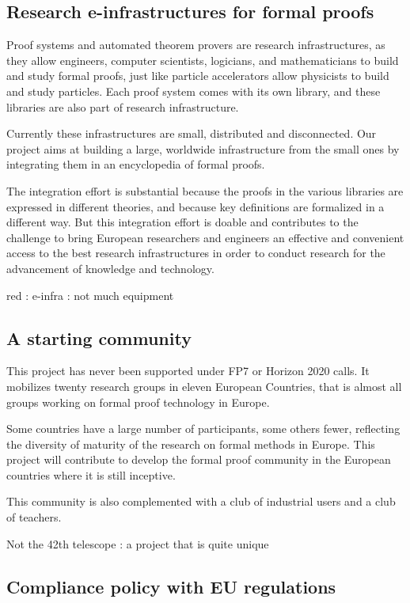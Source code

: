 \subsection{Research e-infrastructures for formal proofs}

Proof systems and automated theorem provers are research
infrastructures, as they allow engineers, computer scientists,
logicians, and mathematicians to build and study formal proofs, just
like particle accelerators allow physicists to build and study
particles. Each proof system comes with its own library, and these
libraries are also part of research infrastructure.

Currently these infrastructures are small, distributed and
disconnected.  Our project aims at building a large, worldwide
infrastructure from the small ones by integrating them in an
encyclopedia of formal proofs.

The integration effort is substantial because the proofs in the
various libraries are expressed in different theories, and because key
definitions are formalized in a different way.  But this integration
effort is doable and contributes to the challenge to bring European
researchers and engineers an effective and convenient access to the
best research infrastructures in order to conduct research for the
advancement of knowledge and technology.

{\color{red}  red : e-infra : not much equipment}

\subsection{A starting community}

This project has never been supported under FP7 or Horizon 2020 calls.
It mobilizes twenty research groups in eleven European Countries, that is
almost all groups working on formal proof technology in Europe.

Some countries have a large number of participants, some others fewer,
reflecting the diversity of maturity of the research on formal methods
in Europe. This project will contribute to develop the formal proof
community in the European countries where it is still inceptive.

This community is also complemented with a club of industrial users and
a club of teachers.

{\color{red} Not the 42th telescope : a project that is quite unique}

\subsection{Compliance policy with EU regulations}

